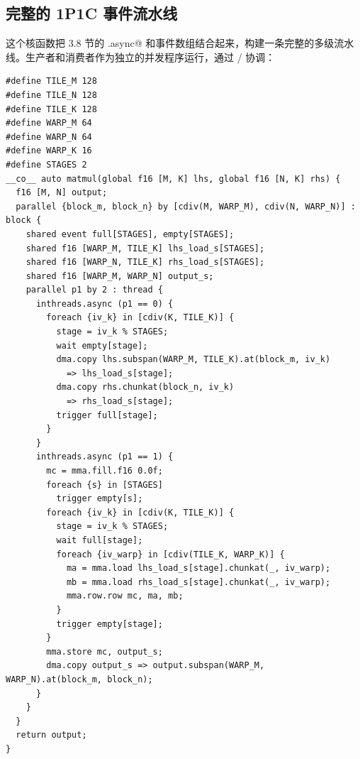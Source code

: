 \subsection*{完整的 1P1C 事件流水线}

这个核函数把 3.8 节的 \co@inthreads.async@ 和事件数组结合起来，构建一条完整的多级流水线。生产者和消费者作为独立的并发程序运行，通过 \co@wait@ / \co@trigger@ 协调：

\begin{lstlisting}[language=croqtile,caption={完整的 1P1C 事件流水线}]
#define TILE_M 128
#define TILE_N 128
#define TILE_K 128
#define WARP_M 64
#define WARP_N 64
#define WARP_K 16
#define STAGES 2
__co__ auto matmul(global f16 [M, K] lhs, global f16 [N, K] rhs) {
  f16 [M, N] output;
  parallel {block_m, block_n} by [cdiv(M, WARP_M), cdiv(N, WARP_N)] : block {
    shared event full[STAGES], empty[STAGES];
    shared f16 [WARP_M, TILE_K] lhs_load_s[STAGES];
    shared f16 [WARP_N, TILE_K] rhs_load_s[STAGES];
    shared f16 [WARP_M, WARP_N] output_s;
    parallel p1 by 2 : thread {
      inthreads.async (p1 == 0) {
        foreach {iv_k} in [cdiv(K, TILE_K)] {
          stage = iv_k % STAGES;
          wait empty[stage];
          dma.copy lhs.subspan(WARP_M, TILE_K).at(block_m, iv_k)
            => lhs_load_s[stage];
          dma.copy rhs.chunkat(block_n, iv_k)
            => rhs_load_s[stage];
          trigger full[stage];
        }
      }
      inthreads.async (p1 == 1) {
        mc = mma.fill.f16 0.0f;
        foreach {s} in [STAGES]
          trigger empty[s];
        foreach {iv_k} in [cdiv(K, TILE_K)] {
          stage = iv_k % STAGES;
          wait full[stage];
          foreach {iv_warp} in [cdiv(TILE_K, WARP_K)] {
            ma = mma.load lhs_load_s[stage].chunkat(_, iv_warp);
            mb = mma.load rhs_load_s[stage].chunkat(_, iv_warp);
            mma.row.row mc, ma, mb;
          }
          trigger empty[stage];
        }
        mma.store mc, output_s;
        dma.copy output_s => output.subspan(WARP_M, WARP_N).at(block_m, block_n);
      }
    }
  }
  return output;
}
\end{lstlisting}
